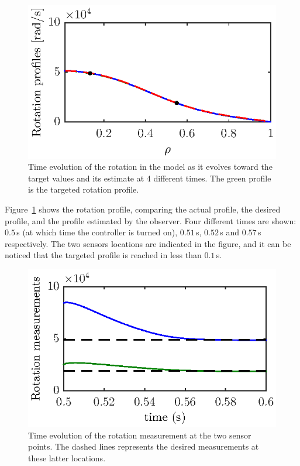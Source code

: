 \documentclass[12pt,lot, lof]{puthesis}
\begin{document}
\begin{figure}
	\includegraphics[width=0.65 \linewidth]{fig13d}
	\caption{Time evolution of the rotation in the model as it evolves toward the target values and its estimate at 4 different times. The green profile is the targeted rotation profile. }
	\label{fig:rot18}
\end{figure}


Figure~\ref{fig:rot18} shows the rotation profile, comparing the actual profile, the desired profile, and the profile estimated by the observer.  Four different times are shown: $0.5$\,s (at which time the controller is turned on), $0.51$\,s, $0.52$\,s and $0.57$\,s respectively. The two sensors locations are indicated in the figure, and it can be noticed that the targeted profile is reached in less than $0.1$\,s.
\begin{figure}
\centering
\includegraphics[width=0.7 \linewidth]{fig14}
\caption{Time evolution of the rotation measurement at the two sensor points. The dashed lines represents the desired measurements at these latter locations.}
\label{fig:rot20}
\end{figure}    
\end{document}
